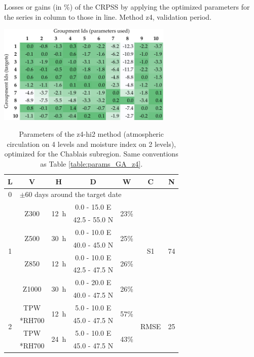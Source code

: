 \documentclass{ametsoc}
\begin{document}
\begin{table}[htb]
	\caption{Losses or gains (in \%) of the CRPSS by applying the optimized parameters for the series in column to those in line. Method z4, validation period.}
	\centerline{\includegraphics[width=8.3cm]{figures/table_crossing_z4_valid.pdf}}
	\label{table:crossing_z4_valid}
\end{table}


\clearpage


\begin{table}[htbp]
	\footnotesize
	\caption{Parameters of the z4-hi2 method (atmospheric circulation on 4 levels and moisture index on 2 levels), optimized for the Chablais subregion. Same conventions as Table \ref{table:params_GA_z4}.}
	\begin{center}
		\begin{tabular}{ccccccc}
			\hline \textbf{L} & \textbf{V} & \textbf{H} & \textbf{D} & \textbf{W} & \textbf{C} & \textbf{N} \\ 
			\hline 
			0 & \multicolumn{6}{l}{$\pm 60$ days around the target date} \\
			\hline 
			\multirow{8}{*}{1} &  \multirow{2}{*}{Z300} & \multirow{2}{*}{12~h} & 0.0 - 15.0 \degree E & \multirow{2}{*}{23\%} & \multirow{8}{*}{S1} & \multirow{8}{*}{74} \\
			& & & 42.5 - 55.0 \degree N & & & \\ 
			& \multirow{2}{*}{Z500} & \multirow{2}{*}{30~h} & 0.0 - 10.0 \degree E & \multirow{2}{*}{25\%} & & \\ 
			& & & 40.0 - 45.0 \degree N & & & \\ 
			& \multirow{2}{*}{Z850} & \multirow{2}{*}{12~h} & 0.0 - 10.0 \degree E & \multirow{2}{*}{26\%} & & \\ 
			& & & 42.5 - 47.5 \degree N & & & \\ 
			& \multirow{2}{*}{Z1000} & \multirow{2}{*}{30~h} & 0.0 - 20.0 \degree E & \multirow{2}{*}{26\%} & & \\ 
			& & & 40.0 - 47.5 \degree N & & & \\ 
			\hline 
			\multirow{4}{*}{2} & TPW & \multirow{2}{*}{12~h} & 5.0 - 10.0 \degree E & \multirow{2}{*}{57\%} & \multirow{4}{*}{RMSE} & \multirow{4}{*}{25} \\
			& *RH700 & & 45.0 - 47.5 \degree N & & & \\ 
			& TPW & \multirow{2}{*}{24~h} & 5.0 - 10.0 \degree E & \multirow{2}{*}{43\%} & & \\ 
			& *RH700 & & 45.0 - 47.5 \degree N & & & \\ 
			\hline 
		\end{tabular} 
	\end{center}
	\label{table:params_GA_z4_hi2}
\end{table}
\end{document}
